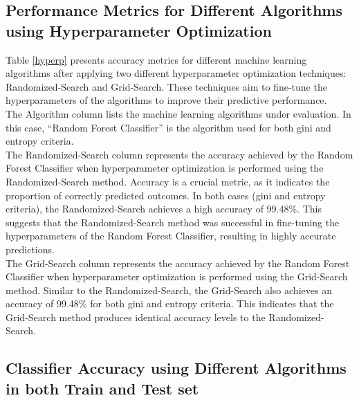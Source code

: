 \documentclass{article}
\begin{document}
\begin{multicols}{2}


\subsection{Performance Metrics for Different Algorithms using Hyperparameter Optimization}
\hspace*{\parindent} Table \ref{hyperp} presents accuracy metrics for different machine learning algorithms after applying two different hyperparameter optimization techniques: Randomized-Search and Grid-Search. These techniques aim to fine-tune the hyperparameters of the algorithms to improve their predictive performance.\\
\hspace*{\parindent}The Algorithm column lists the machine learning algorithms under evaluation. In this case, ``Random Forest Classifier'' is the algorithm used for both gini and entropy criteria. \\
\hspace*{\parindent}The Randomized-Search column represents the accuracy achieved by the Random Forest Classifier when hyperparameter optimization is performed using the Randomized-Search method. Accuracy is a crucial metric, as it indicates the proportion of correctly predicted outcomes. In both cases (gini and entropy criteria), the Randomized-Search achieves a high accuracy of 99.48\%. This suggests that the Randomized-Search method was successful in fine-tuning the hyperparameters of the Random Forest Classifier, resulting in highly accurate predictions.\\
\hspace*{\parindent}The Grid-Search column represents the accuracy achieved by the Random Forest Classifier when hyperparameter optimization is performed using the Grid-Search method. Similar to the Randomized-Search, the Grid-Search also achieves an accuracy of 99.48\% for both gini and entropy criteria. This indicates that the Grid-Search method produces identical accuracy levels to the Randomized-Search.

\subsection{Classifier Accuracy using Different Algorithms in both Train and Test set}


\end{multicols}
\end{document}

